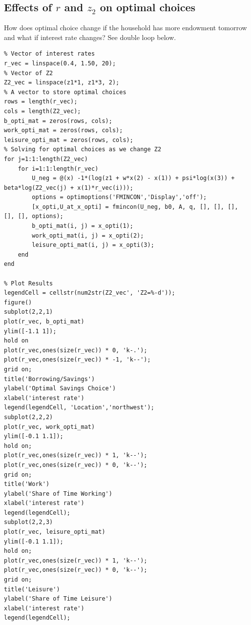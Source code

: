 \documentclass[
]{book}
\begin{document}
\hypertarget{effects-of-r-and-z_2-on-optimal-choices}{%
\subsection{\texorpdfstring{Effects of \(r\) and \(z_2\) on optimal choices}{Effects of r and z\_2 on optimal choices}}\label{effects-of-r-and-z_2-on-optimal-choices}}

How does optimal choice change if the household has more endowment
tomorrow and what if interest rate changes? See double loop below.

\begin{verbatim}
% Vector of interest rates
r_vec = linspace(0.4, 1.50, 20);
% Vector of Z2
Z2_vec = linspace(z1*1, z1*3, 2);
% A vector to store optimal choices
rows = length(r_vec);
cols = length(Z2_vec);
b_opti_mat = zeros(rows, cols);
work_opti_mat = zeros(rows, cols);
leisure_opti_mat = zeros(rows, cols);
% Solving for optimal choices as we change Z2
for j=1:1:length(Z2_vec)
    for i=1:1:length(r_vec)
        U_neg = @(x) -1*(log(z1 + w*x(2) - x(1)) + psi*log(x(3)) + beta*log(Z2_vec(j) + x(1)*r_vec(i)));
        options = optimoptions('FMINCON','Display','off');
        [x_opti,U_at_x_opti] = fmincon(U_neg, b0, A, q, [], [], [], [], [], options);
        b_opti_mat(i, j) = x_opti(1);
        work_opti_mat(i, j) = x_opti(2);
        leisure_opti_mat(i, j) = x_opti(3);
    end
end

% Plot Results
legendCell = cellstr(num2str(Z2_vec', 'Z2=%-d'));
figure()
subplot(2,2,1)
plot(r_vec, b_opti_mat)
ylim([-1.1 1]);
hold on
plot(r_vec,ones(size(r_vec)) * 0, 'k-.');
plot(r_vec,ones(size(r_vec)) * -1, 'k--');
grid on;
title('Borrowing/Savings')
ylabel('Optimal Savings Choice')
xlabel('interest rate')
legend(legendCell, 'Location','northwest');
subplot(2,2,2)
plot(r_vec, work_opti_mat)
ylim([-0.1 1.1]);
hold on;
plot(r_vec,ones(size(r_vec)) * 1, 'k--');
plot(r_vec,ones(size(r_vec)) * 0, 'k--');
grid on;
title('Work')
ylabel('Share of Time Working')
xlabel('interest rate')
legend(legendCell);
subplot(2,2,3)
plot(r_vec, leisure_opti_mat)
ylim([-0.1 1.1]);
hold on;
plot(r_vec,ones(size(r_vec)) * 1, 'k--');
plot(r_vec,ones(size(r_vec)) * 0, 'k--');
grid on;
title('Leisure')
ylabel('Share of Time Leisure')
xlabel('interest rate')
legend(legendCell);
\end{verbatim}
\end{document}
